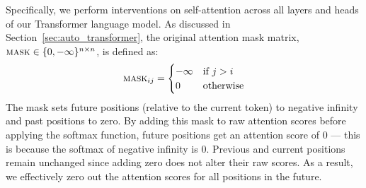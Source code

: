 \begin{table}[!ht]
  \centering
\caption{Comparison of log-probabilities for each token of example sentences processed by our Transformer LM, before and after the intervention on ``que''. Sentences contain either the plural form of the target verb \textit{acceptés}, or its singular form \textit{accepté}. $\mathcal{A}$-column: 1 indicates a predicted agreement feature matching the gold label, 0 indicates no match. 
\label{ex:mask_que}  }
\end{table}

Specifically, we perform interventions on self-attention  across all layers and heads of our Transformer language model.  
As discussed in Section~\ref{sec:auto_transformer}, the original attention mask matrix, $\textsc{mask} \in \{0, -\infty\}^{n \times n}$, is defined as:
\begin{equation}
\textsc{mask}_{ij} = \begin{cases}
-\infty & \text{if } j > i \\
 0 & \text{otherwise}
 \label{eq:orig_attention_mask}
\end{cases}
\end{equation}
\noindent The mask sets future positions (relative to the current token) to negative infinity and past positions to zero. By adding this mask to raw attention scores before applying the softmax function, future positions get an attention score of 0 --- this is because the softmax of negative infinity is 0. Previous and current positions remain unchanged since adding zero does not alter their raw scores. As a result, we effectively zero out the attention scores for all positions in the future.


